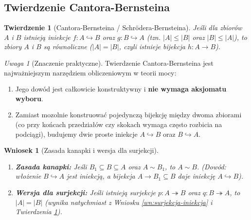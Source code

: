 \documentclass[11pt, a4paper]{article}
\theoremstyle{definition}
\theoremstyle{plain}
\newtheorem{twierdzenie}[definicja]{Twierdzenie}
\newtheorem{wniosek}[definicja]{Wniosek}
\theoremstyle{remark}
\newtheorem*{uwaga}{Uwaga}
\begin{document}
\subsection{Twierdzenie Cantora-Bernsteina}

\begin{twierdzenie}[Cantora-Bernsteina / Schrödera-Bernsteina]\label{tw:cb}
Jeśli dla zbiorów $A$ i $B$ istnieją iniekcje $f : A \hookrightarrow B$ oraz $g : B \hookrightarrow A$ (tzn. $|A| \le |B|$ oraz $|B| \le |A|$), to zbiory $A$ i $B$ są równoliczne ($|A| = |B|$, czyli istnieje bijekcja $h : A \to B$).
\end{twierdzenie}

\begin{uwaga}[Znaczenie praktyczne]
Twierdzenie Cantora-Bernsteina jest najważniejszym narzędziem obliczeniowym w teorii mocy:
\begin{enumerate}
    \item Jego dowód jest całkowicie konstruktywny i \textbf{nie wymaga aksjomatu wyboru}.
    \item Zamiast mozolnie konstruować pojedynczą bijekcję między dwoma zbiorami (co przy końcach przedziałów czy skokach wymaga często rozbicia na podciągi), budujemy dwie proste iniekcje $A \hookrightarrow B$ oraz $B \hookrightarrow A$.
\end{enumerate}
\end{uwaga}

\begin{wniosek}[Zasada kanapki i wersja dla surjekcji]
\begin{enumerate}
    \item \textbf{Zasada kanapki:} Jeśli $B_1 \subseteq B \subseteq A$ oraz $A \sim B_1$, to $A \sim B$. (Dowód: włożenie $B \hookrightarrow A$ jest iniekcją, a bijekcja $A \to B_1 \subseteq B$ daje iniekcję $A \hookrightarrow B$).
    \item \textbf{Wersja dla surjekcji:} Jeśli istnieją surjekcje $p : A \twoheadrightarrow B$ oraz $q : B \twoheadrightarrow A$, to $|A| = |B|$ (wynika natychmiast z Wniosku \ref{wn:surjekcja-iniekcja} i Twierdzenia \ref{tw:cb}).
\end{enumerate}
\end{wniosek}
\end{document}
